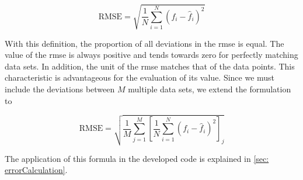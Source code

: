 \begin{equation} \label{eq: RMSE}
    \text{RMSE} = \sqrt{\frac{1}{N}\sum_{i=1}^{N} (f_i - \hat{f}_i)^2}
\end{equation}

With this definition, the proportion of all deviations in the \acrshort{rmse} is equal. The value of the \acrshort{rmse} is always positive and tends towards zero for perfectly matching data sets. In addition, the unit of the \acrshort{rmse} matches that of the data points. This characteristic is advantageous for the evaluation of its value. Since we must include the deviations between $M$ multiple data sets, we extend the formulation to 

\begin{equation} \label{eq: multiRMSE}
    \text{RMSE} = \sqrt{\frac{1}{M} \sum_{j=1}^{M} \left[ \frac{1}{N} \sum_{i=1}^{N} (f_i - \hat{f}_i)^2 \right] _j}
\end{equation}

The application of this formula in the developed code is explained in \autoref{sec: errorCalculation}.








